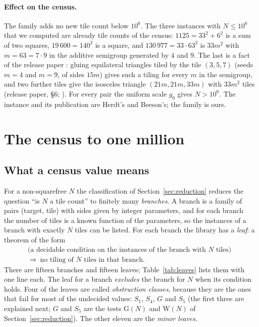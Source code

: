 \documentclass[11pt,reqno]{amsart}
\theoremstyle{plain}
\theoremstyle{definition}
\begin{document}
\paragraph{Effect on the census.} The family adds no new tile count below $10^6$. The three instances with $N\le10^6$ that we computed are already tile counts of the census: $1125=33^2+6^2$ is a sum of two squares, $19\,600=140^2$ is a square, and
$130\,977=33\cdot63^2$ is $33m^2$ with $m=63=7\cdot9$ in the additive semigroup generated by $4$ and $9$. The last is a fact of the release paper \cite{ReleasePaper}: gluing equilateral triangles tiled by the tile $(3,5,7)$ (seeds $m=4$ and $m=9$, of sides $15m$) gives such a tiling for every $m$ in the semigroup, and two further tiles give the isosceles triangle $(21m,21m,33m)$ with $33m^2$ tiles (release paper, \S6; ).
For every pair the uniform scale $g_0$ gives $N>10^6$. The instance and its publication are Herdt's and Beeson's; the family is ours.



\section{The census to one million}\label{sec:census}

\subsection{What a census value means}
For a non-squarefree $N$ the classification of Section~\ref{sec:reduction} reduces the question ``is $N$ a tile count'' to finitely many
\emph{branches}. A branch is a family of pairs (target, tile) with sides given by integer parameters, and for each branch the number of tiles
is a known function of the parameters, so the instances of a branch with exactly $N$ tiles can be listed. For each branch the library has a \emph{leaf}: a theorem of the form
\[
\begin{array}{c}\text{(a decidable condition on the instances of the branch with $N$ tiles)}\\ \Longrightarrow\ \text{no tiling of $N$ tiles in that branch}.\end{array}
\]
There are fifteen branches and fifteen leaves; Table~\ref{tab:leaves} lists them with one line each. The leaf for a branch \emph{excludes} the branch for $N$ when its condition holds.
Four of the leaves are called \emph{obstruction classes}, because they are the ones that fail for most of the undecided values: $S_1$, $S_4$, $G$ and $S_5$ (the first three are explained next; $G$ and $S_5$ are the tests $\mathrm{G}(N)$ and $\mathrm{W}(N)$ of Section~\ref{sec:reduction}). The other eleven are the \emph{minor leaves}.
\end{document}
